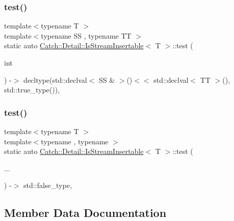 \subsubsection{\texorpdfstring{test()}{test()}\hspace{0.1cm}{\footnotesize\ttfamily [1/2]}}
{\footnotesize\ttfamily template$<$typename T $>$ \\
template$<$typename SS , typename TT $>$ \\
static auto \mbox{\hyperlink{class_catch_1_1_detail_1_1_is_stream_insertable}{Catch\+::\+Detail\+::\+Is\+Stream\+Insertable}}$<$ T $>$\+::test (\begin{DoxyParamCaption}\item[{int}]{ }\end{DoxyParamCaption}) -\/$>$  decltype(std\+::declval$<$ SS \& $>$()$<$$<$ std\+::declval$<$ TT $>$(), std\+::true\+\_\+type())\hspace{0.3cm}{\ttfamily [static]}, {\ttfamily [private]}}

\mbox{\label{class_catch_1_1_detail_1_1_is_stream_insertable_ac5761375646929916dc5e165d44cd3d9}} 
\subsubsection{\texorpdfstring{test()}{test()}\hspace{0.1cm}{\footnotesize\ttfamily [2/2]}}
{\footnotesize\ttfamily template$<$typename T $>$ \\
template$<$typename , typename $>$ \\
static auto \mbox{\hyperlink{class_catch_1_1_detail_1_1_is_stream_insertable}{Catch\+::\+Detail\+::\+Is\+Stream\+Insertable}}$<$ T $>$\+::test (\begin{DoxyParamCaption}\item[{}]{... }\end{DoxyParamCaption}) -\/$>$  std\+::false\+\_\+type\hspace{0.3cm}{\ttfamily [static]}, {\ttfamily [private]}}



\subsection{Member Data Documentation}
\mbox{\label{class_catch_1_1_detail_1_1_is_stream_insertable_a42818b09ae5851126a70ee263769e309}} 
